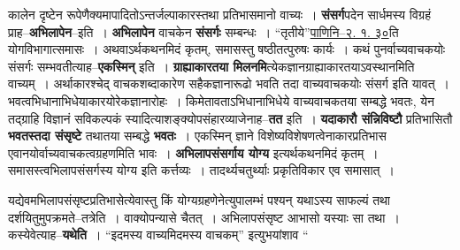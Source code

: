\documentclass[article,12pt,a4paper]{memoir}
\begin{document}
	  \pstart कालेन दृष्टेन रूपेणैक्यमापादितोऽन्तर्जल्पाकारस्तथा प्रतिभासमानो वाच्यः । \textbf{संसर्ग}पदेन सार्धमस्य विग्रहं प्राह--\textbf{अभिलापेन}--इति । \textbf{अभिलापेन} वाचकेन \textbf{संसर्गः} सम्बन्धः । “तृतीये”\href{http://http://sarit.indology.info/?cref=Pā.2.1.30}{पाणिनि--२. १. ३०}ति योगविभागात्समासः । अथवाऽर्थकथनमिदं कृतम्, समासस्तु षष्ठीतत्पुरुषः कार्यः । कथं पुनर्वाच्यवाचकयोः संसर्गः सम्भवतीत्याह--\textbf{एकस्मिन्} इति । \textbf{ग्राह्याकारतया मिलनमि}त्येकज्ञानग्राह्याकारतयाऽवस्थानमिति वाच्यम् । अर्थाकारश्चेद् वाचकशब्दाकारेण सहैकज्ञानारूढो भवति तदा वाच्यवाचकयोः संसर्ग इति यावत् । भवत्वभिधानाभिधेयाकारयोरेकज्ञानारोहः । किमेतावताऽभिधानाभिधेये वाच्यवाचकतया सम्बद्धे भवतः, येन तद्ग्राहि विज्ञानं सविकल्पकं स्यादित्याशङ्क्योपसंहारव्याजेनाह--\textbf{तत} इति । \textbf{यदाकारौ संन्निविष्टौ} प्रतिभासितौ \textbf{भवतस्तदा संसृष्टे} तथातया सम्बद्धे \textbf{भवतः} । एकस्मिन् ज्ञाने विशेष्यविशेषणत्वेनाकारप्रतिभास एवानयोर्वाच्यवाचकत्वग्रहणमिति भावः । \textbf{अभिलापसंसर्गाय योग्य} इत्यर्थकथनमिदं \leavevmode{} कृतम् । समासस्त्वभिलापसंसर्गस्य योग्य इति कर्त्तव्यः । तादर्थ्यचतुर्थ्याः प्रकृतिविकार एव समासात् ।
	\pend
      

	  \pstart यद्येवमभिलापसंसृष्टप्रतिभासेत्येवास्तु किं योग्यग्रहणेनेत्युपालम्भं पश्यन् यथाऽस्य साफल्यं तथा दर्शयितुमुपक्रमते--तत्रेति । वाक्योपन्यासे चैतत् । अभिलापसंसृष्ट आभासो यस्याः सा तथा । कस्येवेत्याह--\textbf{यथेति} । “इदमस्य वाच्यमिदमस्य वाचकम्” इत्युभयांशाव  \leavevmode{} “
	  
\end{document}

